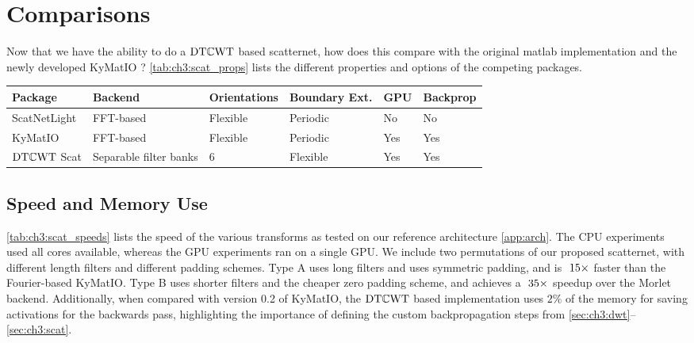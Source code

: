 \section{Comparisons}
Now that we have the ability to do a $\mathrm{DT}\mathbb{C}\mathrm{WT}$ based scatternet, how does this
compare with the original matlab implementation \cite{oyallon_deep_2015} and the newly developed
KyMatIO \cite{andreux_kymatio:_2018}? \autoref{tab:ch3:scat_props} lists the different properties and 
options of the competing packages. 

\begin{table}
  \centering
  {\renewcommand{\arraystretch}{1.2}
  \begin{tabular}{@{}llllll}
    \toprule
    Package & Backend & Orientations & Boundary Ext. & GPU & Backprop \\\midrule
    ScatNetLight\cite{oyallon_deep_2015} & {FFT-based} & Flexible & Periodic & No & No \\
    KyMatIO\cite{andreux_kymatio:_2018} & {FFT-based}& Flexible & Periodic & Yes & Yes \\
    $\mathrm{DT}\mathbb{C}\mathrm{WT}$ Scat & {Separable filter banks} & 6 & Flexible & Yes & Yes \\
    \bottomrule
  \end{tabular}\label{tab:ch3:scat_props}
  }
\end{table}

\subsection{Speed and Memory Use}
\autoref{tab:ch3:scat_speeds} lists the speed of the various transforms as
tested on our reference architecture \autoref{app:arch}. The CPU experiments
used all cores available, whereas the GPU experiments ran on a single GPU\@. We
include two permutations of our proposed scatternet, with different length
filters and different padding schemes. Type A uses long filters and uses
symmetric padding, and is $~15\times$ faster than the Fourier-based KyMatIO\@. Type B
uses shorter filters and the cheaper zero padding scheme, and 
achieves a $~35\times$ speedup over the Morlet backend.
Additionally, when compared with version 0.2 of KyMatIO, the $\mathrm{DT}\mathbb{C}\mathrm{WT}$ based implementation
uses $2\%$ of the memory for saving activations for the
backwards pass, highlighting the importance of defining the custom
backpropagation steps from \autoref{sec:ch3:dwt}--\autoref{sec:ch3:scat}.

